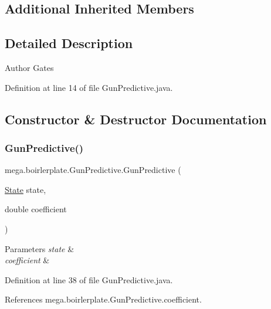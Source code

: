 \subsection*{Additional Inherited Members}


\subsection{Detailed Description}
\begin{DoxyAuthor}{Author}
Gates 
\end{DoxyAuthor}


Definition at line 14 of file Gun\+Predictive.\+java.



\subsection{Constructor \& Destructor Documentation}
\mbox{\label{classmega_1_1boirlerplate_1_1_gun_predictive_a8e8379f079e74bebc7328ebfc07998b3}} 
\subsubsection{\texorpdfstring{Gun\+Predictive()}{GunPredictive()}}
{\footnotesize\ttfamily mega.\+boirlerplate.\+Gun\+Predictive.\+Gun\+Predictive (\begin{DoxyParamCaption}\item[{\hyperlink{classmega_1_1boirlerplate_1_1_state}{State}}]{state,  }\item[{double}]{coefficient }\end{DoxyParamCaption})}


\begin{DoxyParams}{Parameters}
{\em state} & \\
\hline
{\em coefficient} & \\
\hline
\end{DoxyParams}


Definition at line 38 of file Gun\+Predictive.\+java.



References mega.\+boirlerplate.\+Gun\+Predictive.\+coefficient.



